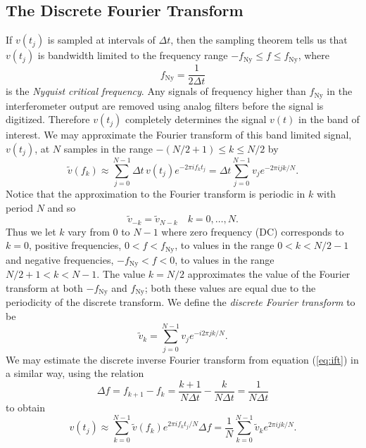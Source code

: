 \subsection{The Discrete Fourier Transform}
\label{ss:dft}

If $v(t_j)$ is sampled at intervals of $\Delta t$, then the sampling
theorem\cite{Press:1992} tells us that $v(t_j)$ is bandwidth limited to the
frequency range $-f_\mathrm{Ny} \le f \le f_\mathrm{Ny}$, where
\begin{equation}
f_\mathrm{Ny} = \frac{1}{2\Delta t}
\end{equation}
is the \emph{Nyquist critical frequency}. Any signals of frequency higher than
$f_\mathrm{Ny}$ in the interferometer output are removed using analog filters before
the signal is digitized. Therefore $v(t_j)$ completely determines the signal
$v(t)$ in the band of interest. We may approximate the Fourier transform of
this band limited signal, $v(t_j)$, at $N$ samples in the range 
$-(N/2 + 1) \le k \le N/2$ by
\begin{equation}
\tilde{v}(f_k) \approx \sum_{j=0}^{N-1} \Delta t\, v(t_j) e^{-2 \pi i f_k t_j}
= \Delta t \sum_{j=0}^{N-1} v_j e^{-2 \pi i j k / N}.
\label{eq:fftapprox}
\end{equation}
Notice that the approximation to the Fourier transform is periodic in $k$ with
period $N$ and so 
\begin{equation}
\tilde{v}_{-k} = \tilde{v}_{N-k}\quad k = 0, \ldots, N.
\end{equation}
Thus we let $k$ vary from $0$ to $N-1$ where zero frequency (DC) corresponds
to $k=0$, positive frequencies, $0 < f < f_\mathrm{Ny}$, to values in the range $0 <
k < N/2-1$ and negative frequencies, $-f_\mathrm{Ny} < f < 0$, to values in the range $N/2+1 <
k < N-1$. The value $k = N/2$ approximates the value of the Fourier
transform at both $-f_\mathrm{Ny}$ and $f_\mathrm{Ny}$; both these values are equal due to
the periodicity of the discrete transform.
We define the \emph{discrete Fourier transform} to be\cite{Anderson:2001a}
\begin{equation}
\tilde{v}_k = \sum_{j=0}^{N-1} v_j e^{-i 2 \pi j k / N}.
\label{eq:dftdef}
\end{equation}
We may estimate the discrete inverse Fourier transform from equation
(\ref{eq:ift}) in a similar way, using the relation
\begin{equation}
\Delta f = f_{k+1} - f_k = \frac{k+1}{N\Delta t} - \frac{k}{N\Delta t} =
\frac{1}{N\Delta t}
\end{equation}
to obtain
\begin{equation}
v(t_j) \approx \sum_{k=0}^{N-1} \tilde{v}(f_k) e^{2 \pi i f_k t_j / N} \Delta f
= \frac{1}{N} \sum_{k=0}^{N-1} \tilde{v}_k e^{2 \pi i j k / N}.
\end{equation}

